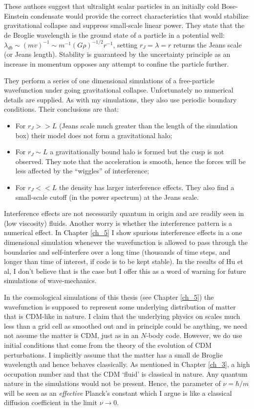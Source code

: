 These authors suggest that ultralight scalar particles in an initially cold Bose-Einstein condensate would provide the correct characteristics that would stabilize gravitational collapse and suppress small-scale linear power.  They state that the de Broglie wavelength is the ground state of a particle in a potential well: $\lambda_{db} \sim (mv)^{-1} \sim m^{-1} (G\rho)^{-1/2} r^{-1}$, setting $r_J = \lambda = r$ returns the Jeans scale (or Jeans length). Stability is guaranteed by the uncertainty principle as an increase in momentum opposes any attempt to confine the particle further.

They perform a series of one dimensional simulations of a free-particle wavefunction under going gravitational collapse. Unfortunately no numerical details are supplied. As with my simulations, they also use periodic boundary conditions. Their conclusions are that:
\begin{itemize}
\item For $r_J >> L$ (Jeans scale much greater than the length of the simulation box) their model does not form a gravitational halo; 
\item For $r_J \sim L$ a gravitationally bound halo is formed but the cusp is not observed. They note that the acceleration is smooth, hence the forces will be less affected by the ``wiggles'' of interference;
\item For $r_J <<L$ the density has larger interference effects. They also find a small-scale cutoff (in the power spectrum) at the Jeans scale.
\end{itemize}

Interference effects are not necessarily quantum in origin and are readily seen in (low viscosity) fluids. Another worry is whether the interference pattern is a numerical effect. In Chapter \ref{ch_5} I show spurious interference effects in a one dimensional simulation whenever the wavefunction is allowed to pass through the boundaries and self-interfere over a long time (thousands of time steps, and longer than time of interest, if code is to be kept stable). In the results of Hu et al, I don't believe that is the case but I offer this as a word of warning for future simulations of wave-mechanics.

In the cosmological simulations of this thesis (see Chapter \ref{ch_5}) the wavefunction is supposed to represent some underlying distribution of matter that is CDM-like in nature. I claim that the underlying physics on scales much less than a grid cell as smoothed out and in principle could be anything, we need not assume the matter is CDM, just as in an $N$-body code. However, we do use initial conditions that come from the theory of the evolution of CDM perturbations. I implicitly assume that the matter has a small de Broglie wavelength and hence behaves classically. As mentioned in Chapter \ref{ch_3}, a high occupation number and that the CDM `fluid' is classical in nature. Any quantum nature in the simulations would not be present. Hence, the parameter of $\nu = \hbar/m$ will be seen as an {\it effective} Planck's constant which I argue is like a classical diffusion coefficient in the limit $\nu \rightarrow 0$.

